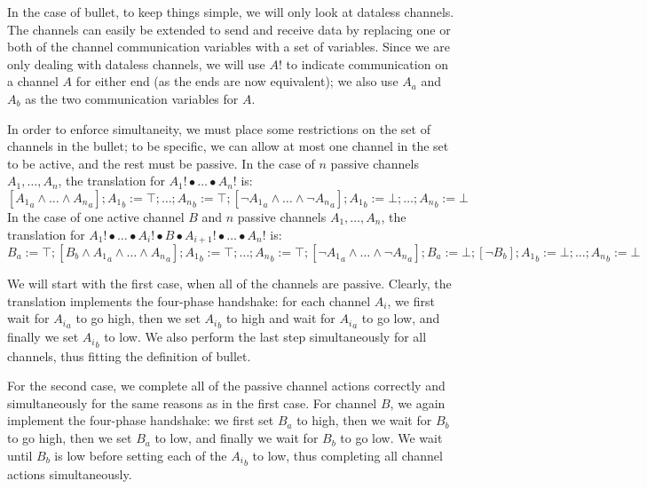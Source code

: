 \documentclass[times, 10pt]{article}
\begin{document}
\vspace{0.05in}

In the case of bullet, to keep things simple, we will only look at dataless
channels. The channels can easily be extended to send and receive data by
replacing one or both of the channel communication variables with a set of
variables. Since we are only dealing with dataless channels, we will use $A!$ to
indicate communication on a channel $A$ for either end (as the ends are now
equivalent); we also use $A_a$ and $A_b$ as the two communication variables for
$A$.

In order to enforce simultaneity, we must place some restrictions on the set of
channels in the bullet; to be specific, we can allow at most one channel in the
set to be active, and the rest must be passive. In the case of $n$ passive
channels $A_1, \ldots, A_n$, the translation for $A_1! \bullet \ldots \bullet
A_n!$ is:
$$[{A_1}_a \wedge \ldots \wedge {A_n}_a]; {A_1}_b := \top; \ldots; {A_n}_b := \top; [\neg {A_1}_a \wedge \ldots \wedge \neg {A_n}_a]; {A_1}_b := \bot; \ldots; {A_n}_b := \bot$$
In the case of one active channel $B$ and $n$ passive channels $A_1, \ldots,
A_n$, the translation for $A_1! \bullet \ldots \bullet A_i! \bullet B \bullet
A_{i + 1}! \bullet \ldots \bullet A_n!$ is:
$$B_a := \top; [B_b \wedge {A_1}_a \wedge \ldots \wedge {A_n}_a]; {A_1}_b := \top; \ldots; {A_n}_b := \top; [\neg {A_1}_a \wedge \ldots \wedge \neg {A_n}_a]; B_a := \bot; [\neg B_b]; {A_1}_b := \bot; \ldots; {A_n}_b := \bot$$

We will start with the first case, when all of the channels are passive.
Clearly, the translation implements the four-phase handshake: for each channel
$A_i$, we first wait for ${A_i}_a$ to go high, then we set ${A_i}_b$ to high and
wait for ${A_i}_a$ to go low, and finally we set ${A_i}_b$ to low. We also
perform the last step simultaneously for all channels, thus fitting the
definition of bullet.

For the second case, we complete all of the passive channel actions correctly
and simultaneously for the same reasons as in the first case. For channel $B$,
we again implement the four-phase handshake: we first set $B_a$ to high, then we
wait for $B_b$ to go high, then we set $B_a$ to low, and finally we wait for
$B_b$ to go low. We wait until $B_b$ is low before setting each of the ${A_i}_b$
to low, thus completing all channel actions simultaneously.

\vspace{0.05in}
\end{document}
